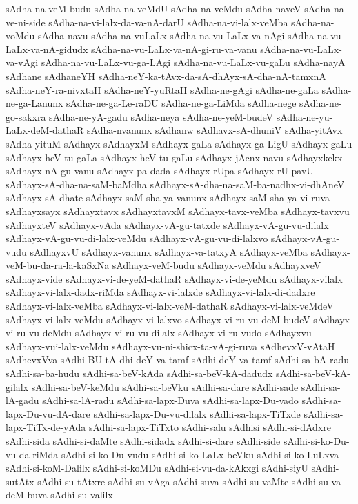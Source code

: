 {sAdha-na-veM-budu
sAdha-na-veMdU
sAdha-na-veMdu
sAdha-naveV
sAdha-na-ve-ni-side
sAdha-na-vi-lalx-da-va-nA-darU
sAdha-na-vi-lalx-veMba
sAdha-na-voMdu
sAdha-navu
sAdha-na-vuLaLx
sAdha-na-vu-LaLx-va-nAgi
sAdha-na-vu-LaLx-va-nA-gidudx
sAdha-na-vu-LaLx-va-nA-gi-ru-va-vanu
sAdha-na-vu-LaLx-va-vAgi
sAdha-na-vu-LaLx-vu-ga-LAgi
sAdha-na-vu-LaLx-vu-gaLu
sAdha-nayA
sAdhane
sAdhaneYH
sAdha-neY-ka-tAvx-da-sA-dhAyx-sA-dha-nA-tamxnA
sAdha-neY-ra-nivxtaH
sAdha-neY-yuRtaH
sAdha-ne-gAgi
sAdha-ne-gaLa
sAdha-ne-ga-Lanunx
sAdha-ne-ga-Le-raDU
sAdha-ne-ga-LiMda
sAdha-nege
sAdha-ne-go-sakxra
sAdha-ne-yA-gadu
sAdha-neya
sAdha-ne-yeM-budeV
sAdha-ne-yu-LaLx-deM-dathaR
sAdha-nvanunx
sAdhanw
sAdhavx-sA-dhuniV
sAdha-yitAvx
sAdha-yituM
sAdhayx
sAdhayxM
sAdhayx-gaLa
sAdhayx-ga-LigU
sAdhayx-gaLu
sAdhayx-heV-tu-gaLa
sAdhayx-heV-tu-gaLu
sAdhayx-jAcnx-navu
sAdhayxkekx
sAdhayx-nA-gu-vanu
sAdhayx-pa-dada
sAdhayx-rUpa
sAdhayx-rU-pavU
sAdhayx-sA-dha-na-saM-baMdha
sAdhayx-sA-dha-na-saM-ba-nadhx-vi-dhAneV
sAdhayx-sA-dhate
sAdhayx-saM-sha-ya-vanunx
sAdhayx-saM-sha-ya-vi-ruva
sAdhayxsayx
sAdhayxtavx
sAdhayxtavxM
sAdhayx-tavx-veMba
sAdhayx-tavxvu
sAdhayxteV
sAdhayx-vAda
sAdhayx-vA-gu-tatxde
sAdhayx-vA-gu-vu-dilalx
sAdhayx-vA-gu-vu-di-lalx-veMdu
sAdhayx-vA-gu-vu-di-lalxvo
sAdhayx-vA-gu-vudu
sAdhayxvU
sAdhayx-vanunx
sAdhayx-va-tatxyA
sAdhayx-veMba
sAdhayx-veM-bu-da-ra-la-kaSxNa
sAdhayx-veM-budu
sAdhayx-veMdu
sAdhayxveV
sAdhayx-vide
sAdhayx-vi-de-yeM-dathaR
sAdhayx-vi-de-yeMdu
sAdhayx-vilalx
sAdhayx-vi-lalx-dadx-riMda
sAdhayx-vi-lalxde
sAdhayx-vi-lalx-di-dadxre
sAdhayx-vi-lalx-veMba
sAdhayx-vi-lalx-veM-dathaR
sAdhayx-vi-lalx-veMdeV
sAdhayx-vi-lalx-veMdu
sAdhayx-vi-lalxvo
sAdhayx-vi-ru-vu-deM-budeV
sAdhayx-vi-ru-vu-deMdu
sAdhayx-vi-ru-vu-dilalx
sAdhayx-vi-ru-vudo
sAdhayxvu
sAdhayx-vui-lalx-veMdu
sAdhayx-vu-ni-shicx-ta-vA-gi-ruva
sAdhevxV-vAtaH
sAdhevxVva
sAdhi-BU-tA-dhi-deY-va-tamf
sAdhi-deY-va-tamf
sAdhi-sa-bA-radu
sAdhi-sa-ba-hudu
sAdhi-sa-beV-kAda
sAdhi-sa-beV-kA-dadudx
sAdhi-sa-beV-kA-gilalx
sAdhi-sa-beV-keMdu
sAdhi-sa-beVku
sAdhi-sa-dare
sAdhi-sade
sAdhi-sa-lA-gadu
sAdhi-sa-lA-radu
sAdhi-sa-lapx-Duva
sAdhi-sa-lapx-Du-vado
sAdhi-sa-lapx-Du-vu-dA-dare
sAdhi-sa-lapx-Du-vu-dilalx
sAdhi-sa-lapx-TiTxde
sAdhi-sa-lapx-TiTx-de-yAda
sAdhi-sa-lapx-TiTxto
sAdhi-salu
sAdhisi
sAdhi-si-dAdxre
sAdhi-sida
sAdhi-si-daMte
sAdhi-sidadx
sAdhi-si-dare
sAdhi-side
sAdhi-si-ko-Du-vu-da-riMda
sAdhi-si-ko-Du-vudu
sAdhi-si-ko-LaLx-beVku
sAdhi-si-ko-LuLxva
sAdhi-si-koM-Dalilx
sAdhi-si-koMDu
sAdhi-si-vu-da-kAkxgi
sAdhi-siyU
sAdhi-sutAtx
sAdhi-su-tAtxre
sAdhi-su-vAga
sAdhi-suva
sAdhi-su-vaMte
sAdhi-su-va-deM-buva
sAdhi-su-valilx
}
